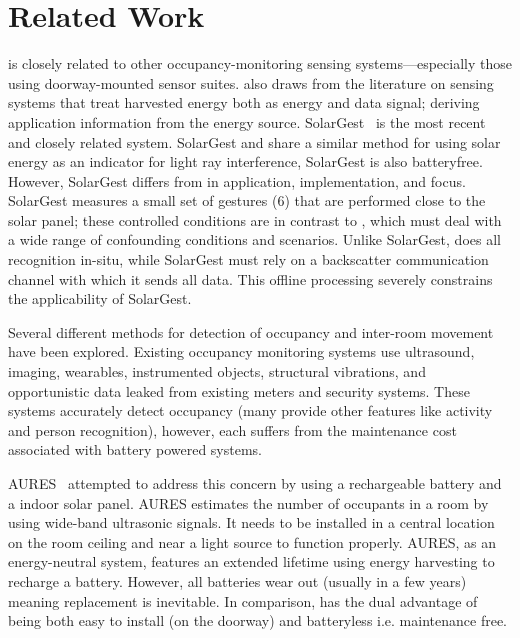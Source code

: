 \section{Related Work}
\label{sec:related}

\sysname is closely related to other occupancy-monitoring sensing systems---especially those using doorway-mounted sensor suites.
\sysname also draws from the literature on sensing systems that treat harvested energy both as energy and data signal; deriving application information from the energy source.
SolarGest~\cite{ma2019solargest} is the most recent and closely related system. SolarGest and \sysname share a similar method for using solar energy as an indicator for light ray interference, SolarGest is also batteryfree. However, SolarGest differs from \sysname in application, implementation, and focus. SolarGest measures a small set of gestures (6) that are performed close to the solar panel; these controlled conditions are in contrast to \sysname, which must deal with a wide range of confounding conditions and scenarios. Unlike SolarGest, \sysname does all recognition in-situ, while SolarGest must rely on a backscatter communication channel with which it sends all data. This offline processing severely constrains the applicability of SolarGest.


Several different methods for detection of occupancy and inter-room movement have been explored. Existing occupancy monitoring systems use ultrasound\cite{hnat2012doorjamb}, imaging\cite{tyndall2016occupancy, teixeira2007lightweight}, wearables\cite{fishkin2005hands}, instrumented objects\cite{buettner2009activity}, structural vibrations\cite{pan2016occupant}, and opportunistic data leaked from existing meters and security systems\cite{yangoccupancy2014}.
These systems accurately detect occupancy (many provide other features like activity and person recognition), however, each suffers from the maintenance cost associated with battery powered systems.

AURES~\cite{shih2016aures} attempted to address this concern by using a rechargeable battery and a indoor solar panel.
AURES estimates the number of occupants in a room by using wide-band ultrasonic signals.
It needs to be installed in a central location on the room ceiling and near a light source to function properly.
AURES, as an energy-neutral system, features an extended lifetime using energy harvesting to recharge a battery.
However, all batteries wear out (usually in a few years) meaning replacement is inevitable.
In comparison, \sysname has the dual advantage of being both easy to install (on the doorway) and batteryless i.e. maintenance free.

